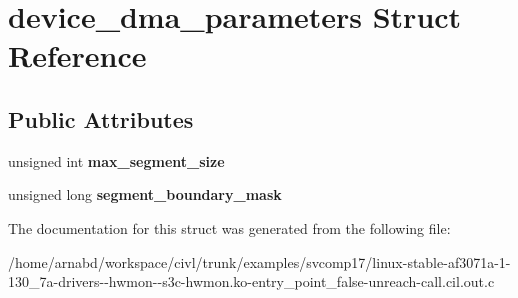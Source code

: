 \hypertarget{structdevice__dma__parameters}{}\section{device\+\_\+dma\+\_\+parameters Struct Reference}
\label{structdevice__dma__parameters}
\subsection*{Public Attributes}
\begin{DoxyCompactItemize}
\item 
\hypertarget{structdevice__dma__parameters_a1be64ce93feabebbca48a7e870078b5d}{}unsigned int {\bfseries max\+\_\+segment\+\_\+size}\label{structdevice__dma__parameters_a1be64ce93feabebbca48a7e870078b5d}

\item 
\hypertarget{structdevice__dma__parameters_a6a7ffa967e97568754642acd7aa33570}{}unsigned long {\bfseries segment\+\_\+boundary\+\_\+mask}\label{structdevice__dma__parameters_a6a7ffa967e97568754642acd7aa33570}

\end{DoxyCompactItemize}


The documentation for this struct was generated from the following file\+:\begin{DoxyCompactItemize}
\item 
/home/arnabd/workspace/civl/trunk/examples/svcomp17/linux-\/stable-\/af3071a-\/1-\/130\+\_\+7a-\/drivers-\/-\/hwmon-\/-\/s3c-\/hwmon.\+ko-\/entry\+\_\+point\+\_\+false-\/unreach-\/call.\+cil.\+out.\+c\end{DoxyCompactItemize}
